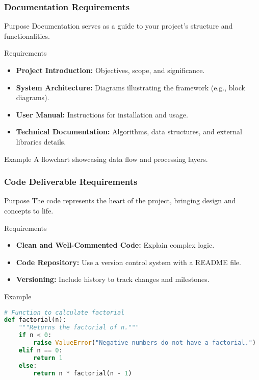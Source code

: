 \documentclass[aspectratio=169]{beamer}
\begin{document}
\begin{frame}[fragile]
    \frametitle{Documentation Requirements}
    \begin{block}{Purpose}
        Documentation serves as a guide to your project's structure and functionalities.
    \end{block}
    
    \begin{block}{Requirements}
        \begin{itemize}
            \item \textbf{Project Introduction:} Objectives, scope, and significance.
            \item \textbf{System Architecture:} Diagrams illustrating the framework (e.g., block diagrams).
            \item \textbf{User Manual:} Instructions for installation and usage.
            \item \textbf{Technical Documentation:} Algorithms, data structures, and external libraries details.
        \end{itemize}
    \end{block}
    
    \begin{block}{Example}
        A flowchart showcasing data flow and processing layers.
    \end{block}
\end{frame}

\begin{frame}[fragile]
    \frametitle{Code Deliverable Requirements}
    \begin{block}{Purpose}
        The code represents the heart of the project, bringing design and concepts to life.
    \end{block}
    
    \begin{block}{Requirements}
        \begin{itemize}
            \item \textbf{Clean and Well-Commented Code:} Explain complex logic.
            \item \textbf{Code Repository:} Use a version control system with a README file.
            \item \textbf{Versioning:} Include history to track changes and milestones.
        \end{itemize}
    \end{block}
    
    \begin{block}{Example}
        \begin{lstlisting}[language=Python]
# Function to calculate factorial
def factorial(n):
    """Returns the factorial of n."""
    if n < 0:
        raise ValueError("Negative numbers do not have a factorial.")
    elif n == 0:
        return 1
    else:
        return n * factorial(n - 1)
        \end{lstlisting}
    \end{block}
\end{frame}
\end{document}

